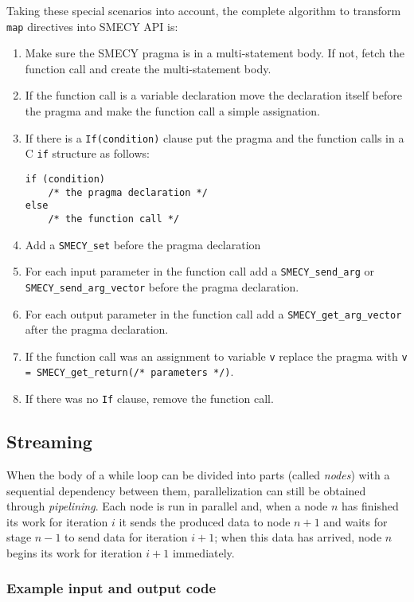 \documentclass[a4paper]{article}
\begin{document}
	Taking these special scenarios into account, the complete algorithm to transform \verb+map+ directives into SMECY API is:
	\begin{enumerate}
		\item Make sure the SMECY pragma is in a multi-statement body. If not, fetch the function call and create the multi-statement body.
		\item If the function call is a variable declaration move the declaration itself before the pragma and make the function call a simple assignation.
		\item If there is a \verb+If(condition)+ clause put the pragma and the function calls in a C \verb+if+ structure as follows:
		\begin{lstlisting}[frame=none, numbers=none]
if (condition)
	/* the pragma declaration */
else
	/* the function call */
		\end{lstlisting}
		\item Add a \verb+SMECY_set+ before the pragma declaration
		\item For each input parameter in the function call add a \verb+SMECY_send_arg+ or \verb+SMECY_send_arg_vector+ before the pragma declaration.
		\item For each output parameter in the function call add a \verb+SMECY_get_arg_vector+ after the pragma declaration.
		\item If the function call was an assignment to variable \verb+v+ replace the pragma with \verb+v = SMECY_get_return(/* parameters */)+.
		\item If there was no \verb+If+ clause, remove the function call.
	\end{enumerate}

	\subsection{Streaming}
	When the body of a while loop can be divided into parts (called \emph{nodes}) with a sequential dependency between them, parallelization can still be obtained through \emph{pipelining}. Each node is run in parallel and, when a node $n$ has finished its work for iteration $i$ it sends the produced data to node $n+1$ and waits for stage $n-1$ to send data for iteration $i+1$; when this data has arrived, node $n$ begins its work for iteration $i+1$ immediately.
	
	\subsubsection{Example input and output code}
	
\end{document}
